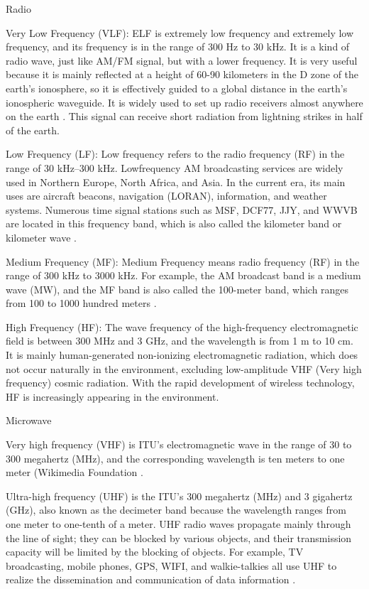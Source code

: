 \documentclass[conference]{IEEEtran}
\newcommand{\subparagraph}{}
\begin{document}
\subparagraph{Radio}
    
Very Low Frequency (VLF): ELF is extremely low frequency and extremely low frequency, and its frequency is in the range of 
300 Hz to 30 kHz. It is a kind of radio wave, just like AM/FM signal, but with a lower frequency. It is very useful because 
it is mainly reflected at a height of 60-90 kilometers in the D zone of the earth's ionosphere, so it is effectively guided 
to a global distance in the earth's ionospheric waveguide. It is widely used to set up radio receivers almost anywhere on 
the earth \cite{Introduc19:online}. This signal can receive short radiation from lightning strikes in half of the earth.
    
Low Frequency (LF): Low frequency refers to the radio frequency (RF) in the range of 30 kHz–300 kHz. Low\-frequency AM 
broadcasting services are widely used in Northern Europe, North Africa, and Asia. In the current era, its main uses are 
aircraft beacons, navigation (LORAN), information, and weather systems. Numerous time signal stations such as MSF, DCF77, 
JJY, and WWVB are located in this frequency band, which is also called the kilometer band or kilometer wave \cite{httpswww63:online}.
    
Medium Frequency (MF): Medium Frequency means radio frequency (RF) in the range of 300 kHz to 3000 kHz. For example, 
the AM broadcast band is a medium wave (MW), and the MF band is also called the 100-meter band, which ranges from 100 
to 1000 hundred meters \cite{httpswww49:online}.
    
High Frequency (HF): The wave frequency of the high-frequency electromagnetic field is between 300 MHz and 3 GHz, and the 
wavelength is from 1 m to 10 cm. It is mainly human-generated non-ionizing electromagnetic radiation, which does not occur 
naturally in the environment, excluding low-amplitude VHF (Very high frequency) cosmic radiation. With the rapid development 
of wireless technology, HF is increasingly appearing in the environment.

\subparagraph{Microwave}
    
Very high frequency (VHF) is ITU's electromagnetic wave in the range of 30 to 300 megahertz (MHz), and the corresponding 
wavelength is ten meters to one meter (Wikimedia Foundation \cite{Veryhigh48:online}.
    
Ultra-high frequency (UHF) is the ITU's 300 megahertz (MHz) and 3 gigahertz (GHz), also known as the decimeter band because 
the wavelength ranges from one meter to one-tenth of a meter. UHF radio waves propagate mainly through the line of sight; 
they can be blocked by various objects, and their transmission capacity will be limited by the blocking of objects. For example, 
TV broadcasting, mobile phones, GPS, WIFI, and walkie-talkies all use UHF to realize the dissemination and communication of data 
information \cite{Ultrahig37:online}.
    
\end{document}
